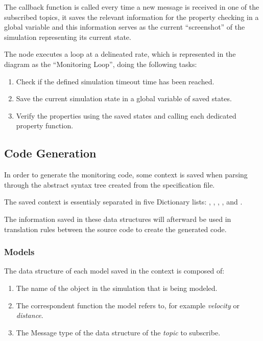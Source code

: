 The callback function is called every time a new message is received in one of the subscribed topics, it saves the relevant information for the property checking in a global variable and this information serves as the current ``screenshot'' of the simulation representing its current state.

The node executes a loop at a delineated rate, which is represented in the diagram as the ``Monitoring Loop'', doing the following tasks:

\begin{enumerate}
    \item Check if the defined simulation timeout time has been reached.
    \item Save the current simulation state in a global variable of saved states.
    \item Verify the properties using the saved states and calling each dedicated property function.
\end{enumerate}


\subsection{Code Generation}
\label{ssec:compileCtx}

In order to generate the monitoring code, some context is saved when parsing through the abstract syntax tree created from the specification file.

The saved context is essentialy separated in five Dictionary lists: , , , , and .

The information saved in these data structures will afterward be used in translation rules between the source code to create the generated code.


\subsubsection{Models}
\label{sssec:compileModels}

The data structure of each model saved in the context is composed of:

\begin{enumerate}
    \item The name of the object in the simulation that is being modeled.
    \item The correspondent function the model refers to, for example \textit{velocity} or \textit{distance}.
    \item The Message type of the data structure of the \textit{topic} to subscribe.
\end{enumerate}

